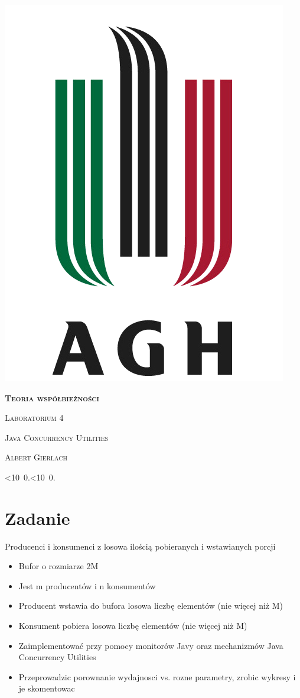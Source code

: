 \documentclass[12pt]{article}
\def\mydate{\leavevmode\hbox{\twodigits\day.\twodigits\month.\the\year}}
\def\twodigits#1{\ifnum#1<10 0\fi\the#1}
\begin{document}
\thispagestyle{empty}
\begin{center}
\begin{minipage}{0.75\linewidth}
    \centering
    \includegraphics[width=0.45\linewidth]{agh_logo2.png}
    \par
    \vspace{2cm}
    {\bfseries{\scshape{\Huge  Teoria współbieżności}}}
    \par
    \vspace{2cm}
    {\scshape{\Large Laboratorium 4}}
    \par
    \vspace{0.4cm}
    {\scshape{\Large Java Concurrency Utilities}}
    \par
    \vspace{3cm}

    {\scshape{\Large Albert Gierlach}}\par
    \vspace{1cm}

    {\Large \mydate}
\end{minipage}
\end{center}
\clearpage



\section{Zadanie}
Producenci i konsumenci z losowa ilością pobieranych i wstawianych porcji

\begin{itemize}
    \item Bufor o rozmiarze 2M
    \item Jest m producentów i n konsumentów
    \item Producent wstawia do bufora losowa liczbę elementów (nie więcej niż M)
    \item Konsument pobiera losowa liczbę elementów (nie więcej niż M)
    \item Zaimplementować przy pomocy monitorów Javy oraz mechanizmów Java Concurrency Utilities
    \item Przeprowadzic porownanie wydajnosci vs. rozne parametry, zrobic wykresy i je skomentowac
\end{itemize}
\end{document}
